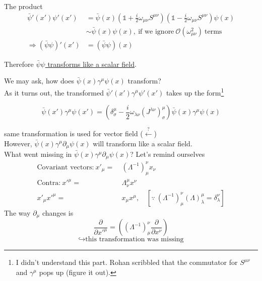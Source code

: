 \documentclass[11pt]{article}
\begin{document}
	\begin{center}
	\end{center}
	
	The product
	\begin{align*}
		\bar{\psi}'(x') \psi'(x') &= \bar{\psi}(x) \left(\mathbb{1} + \frac{i}{2}\omega_{\mu\nu} S^{\mu\nu} \right) \left( \mathbb{1} - \frac{i}{2}\omega_{\mu\nu}S^{\mu\nu} \right) \psi(x) \\
				& \sim \bar{\psi}(x)\psi(x),\ \text{if we ignore}\ \mathcal{O}(\omega_{\mu\nu}^2)\ \text{terms}\\
		\Rightarrow (\bar{\psi}\psi)'(x') &= (\bar{\psi}\psi) (x)
	\end{align*}

Therefore \underline{$\bar{\psi}\psi$ transforms like a scalar field}.

We may ask, how does $\bar{\psi}(x)\gamma^\mu \psi(x)$ transform?\\

As it turns out, the transformed $\bar{\psi}'(x')\gamma^\mu\psi'(x')$ takes up the form\footnote{I didn't understand this part. Rohan scribbled that the commutator for $S^{\mu\nu}$ and $\gamma^\mu$ pops up (figure it out).}

\[ \bar{\psi}(x') \gamma^\mu \psi(x') = \left(\delta^\mu_\sigma - \frac{i}{2}\omega_{\lambda\nu}(J^{\lambda\nu})^\mu_\sigma\right)\bar{\psi}(x)\gamma^\mu \psi (x) \]

same transformation is used for vector field ($\xleftarrow{?}$)\\

\noindent However, $\bar{\psi}(x)\gamma^\mu \partial_\mu \psi(x)$ will transform like a scalar field.\\
What went missing in $\bar{\psi}(x)\gamma^\mu\partial_{\mu}\psi(x)$? Let's remind ourselves
\begin{align*}
	\text{Covariant vectors:}\ x'_\mu =&\ (\Lambda^{-1})^\nu_\mu x_\nu\\
	\text{Contra:}\ x'^\mu =&\ \Lambda^\mu_\nu x^\nu\\
	x'_\mu x'^\mu =&\ x_\mu x^\mu, \quad \left[\because\ (\Lambda^{-1})^\nu_\mu (\Lambda)^\mu_\lambda = \delta^\nu_\lambda\right] 
\end{align*}
The way $\partial_{\mu}$ changes is
	 \[\frac{\partial}{\partial x'^\mu} = \left((\Lambda^{-1})^\nu_\mu \frac{\partial}{\partial x^\nu}\right)\]
\[ \hookrightarrow \text{this transformation was missing}\]
	
\end{document}
